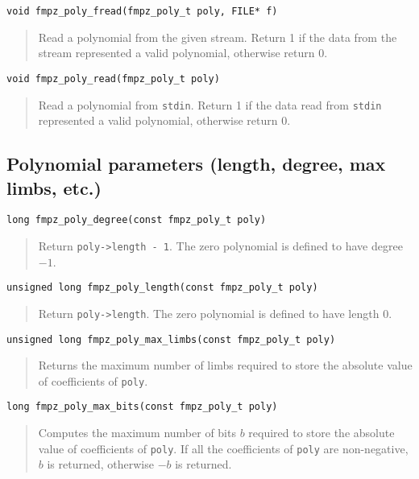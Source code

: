 \documentclass[a4paper,10pt]{article}
\newcommand{\code}{\lstinline}
\begin{document}
\begin{lstlisting}
void fmpz_poly_fread(fmpz_poly_t poly, FILE* f)
\end{lstlisting}
\begin{quote}
Read a polynomial from the given stream. Return 1 if the data from the stream represented a valid polynomial, otherwise return 0.
\end{quote}

\begin{lstlisting}
void fmpz_poly_read(fmpz_poly_t poly)
\end{lstlisting}
\begin{quote}
Read a polynomial from \code{stdin}. Return 1 if the data read from \code{stdin} represented a valid polynomial, otherwise return 0.
\end{quote}

\subsection{Polynomial parameters (length, degree, max limbs, etc.)}

\begin{lstlisting}
long fmpz_poly_degree(const fmpz_poly_t poly)
\end{lstlisting}
\begin{quote}
Return \code{poly->length - 1}. The zero polynomial is defined to have degree $-1$.
\end{quote}

\begin{lstlisting}
unsigned long fmpz_poly_length(const fmpz_poly_t poly)
\end{lstlisting}
\begin{quote}
Return \code{poly->length}. The zero polynomial is defined to have length $0$.
\end{quote}

\begin{lstlisting}
unsigned long fmpz_poly_max_limbs(const fmpz_poly_t poly)
\end{lstlisting}
\begin{quote}
Returns the maximum number of limbs required to store the absolute value of coefficients of \code{poly}. \end{quote}

\begin{lstlisting}
long fmpz_poly_max_bits(const fmpz_poly_t poly)
\end{lstlisting}
\begin{quote}
Computes the maximum number of bits $b$ required to store the absolute value of coefficients of \code{poly}. If all the coefficients of \code{poly} are non-negative, $b$ is returned, otherwise $-b$ is returned. \end{quote}
\end{document}
